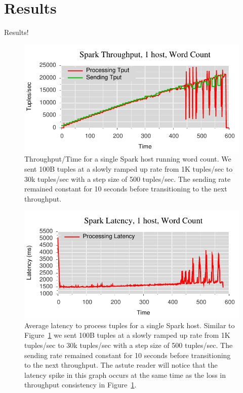 \section{Results}
Results!

\begin{figure}[t]
\centering
\includegraphics[width=1\linewidth]{figures/sp1_tput.pdf}
\caption{Throughput/Time for a single Spark host running word count. We sent 100B tuples at a
slowly ramped up rate from 1K tuples/sec to 30k tuples/sec with a step size of
500 tuples/sec. The sending rate remained constant for 10 seconds before
transitioning to the next throughput.}
\label{fig:sb1-tput}
\end{figure}

\begin{figure}[t]
\centering
\includegraphics[width=1\linewidth]{figures/sp1_latency.pdf}
\caption{Average latency to process tuples for a single Spark host. Similar to
Figure~\ref{fig:sb1-tput} we sent 100B tuples at a slowly ramped up rate from 1K
tuples/sec to 30k tuples/sec with a step size of 500 tuples/sec. The sending
rate remained constant for 10 seconds before transitioning to the next
throughput. The astute reader will notice that the latency spike in this graph
occurs at the same time as the loss in throughput consistency in
Figure~\ref{fig:sb1-tput}.}
\label{fig:label-me-if-you-want}
\end{figure}

